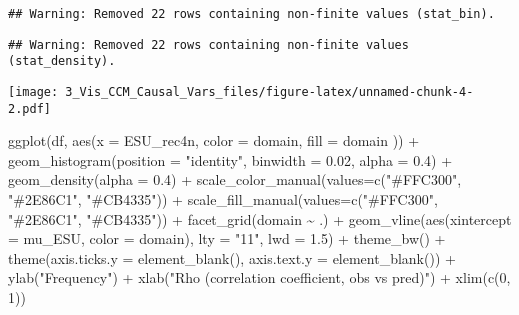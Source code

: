 \documentclass[
]{article}
\newenvironment{Shaded}{\begin{snugshade}}{\end{snugshade}}
\newcommand{\AttributeTok}[1]{\textcolor[rgb]{0.77,0.63,0.00}{#1}}
\newcommand{\DecValTok}[1]{\textcolor[rgb]{0.00,0.00,0.81}{#1}}
\newcommand{\FloatTok}[1]{\textcolor[rgb]{0.00,0.00,0.81}{#1}}
\newcommand{\FunctionTok}[1]{\textcolor[rgb]{0.00,0.00,0.00}{#1}}
\newcommand{\NormalTok}[1]{#1}
\newcommand{\SpecialCharTok}[1]{\textcolor[rgb]{0.00,0.00,0.00}{#1}}
\newcommand{\StringTok}[1]{\textcolor[rgb]{0.31,0.60,0.02}{#1}}
\begin{document}
\begin{verbatim}
## Warning: Removed 22 rows containing non-finite values (stat_bin).
\end{verbatim}

\begin{verbatim}
## Warning: Removed 22 rows containing non-finite values (stat_density).
\end{verbatim}

\texttt{[image: 3\_Vis\_CCM\_Causal\_Vars\_files/figure-latex/unnamed-chunk-4-2.pdf]}

\begin{Shaded}
\begin{Highlighting}[]
\FunctionTok{ggplot}\NormalTok{(df, }\FunctionTok{aes}\NormalTok{(}\AttributeTok{x =}\NormalTok{ ESU\_rec4n, }\AttributeTok{color =}\NormalTok{ domain, }\AttributeTok{fill =}\NormalTok{ domain )) }\SpecialCharTok{+} 
  \FunctionTok{geom\_histogram}\NormalTok{(}\AttributeTok{position =} \StringTok{"identity"}\NormalTok{, }\AttributeTok{binwidth =} \FloatTok{0.02}\NormalTok{, }\AttributeTok{alpha =} \FloatTok{0.4}\NormalTok{) }\SpecialCharTok{+}
  \FunctionTok{geom\_density}\NormalTok{(}\AttributeTok{alpha =} \FloatTok{0.4}\NormalTok{) }\SpecialCharTok{+}
  \FunctionTok{scale\_color\_manual}\NormalTok{(}\AttributeTok{values=}\FunctionTok{c}\NormalTok{(}\StringTok{"\#FFC300"}\NormalTok{, }\StringTok{"\#2E86C1"}\NormalTok{, }\StringTok{"\#CB4335"}\NormalTok{)) }\SpecialCharTok{+}
  \FunctionTok{scale\_fill\_manual}\NormalTok{(}\AttributeTok{values=}\FunctionTok{c}\NormalTok{(}\StringTok{"\#FFC300"}\NormalTok{, }\StringTok{"\#2E86C1"}\NormalTok{, }\StringTok{"\#CB4335"}\NormalTok{)) }\SpecialCharTok{+}
  \FunctionTok{facet\_grid}\NormalTok{(domain }\SpecialCharTok{\textasciitilde{}}\NormalTok{ .) }\SpecialCharTok{+}
  \FunctionTok{geom\_vline}\NormalTok{(}\FunctionTok{aes}\NormalTok{(}\AttributeTok{xintercept =}\NormalTok{ mu\_ESU, }\AttributeTok{color =}\NormalTok{ domain),}
            \AttributeTok{lty =} \StringTok{"11"}\NormalTok{, }\AttributeTok{lwd =} \FloatTok{1.5}\NormalTok{) }\SpecialCharTok{+}
  \FunctionTok{theme\_bw}\NormalTok{() }\SpecialCharTok{+}
  \FunctionTok{theme}\NormalTok{(}\AttributeTok{axis.ticks.y =} \FunctionTok{element\_blank}\NormalTok{(),}
        \AttributeTok{axis.text.y =} \FunctionTok{element\_blank}\NormalTok{()) }\SpecialCharTok{+}
  \FunctionTok{ylab}\NormalTok{(}\StringTok{"Frequency"}\NormalTok{) }\SpecialCharTok{+} \FunctionTok{xlab}\NormalTok{(}\StringTok{"Rho (correlation coefficient, obs vs pred)"}\NormalTok{) }\SpecialCharTok{+}
  \FunctionTok{xlim}\NormalTok{(}\FunctionTok{c}\NormalTok{(}\DecValTok{0}\NormalTok{, }\DecValTok{1}\NormalTok{))}
\end{Highlighting}
\end{Shaded}
\end{document}
